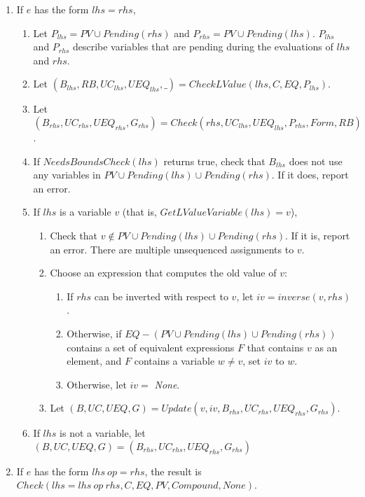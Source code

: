 \begin{enumerate}
\item If $e$ has the form $lhs = rhs$,
\label{list:check-assignment}
\begin{enumerate}
\item Let $P_{lhs} = PV \cup Pending(rhs)$ and $P_{rhs} = PV \cup Pending(lhs).$   $P_{lhs}$
        and $P_{rhs}$ describe variables that are pending during the evaluations of $lhs$ and $rhs$.
\item Let $(B_{lhs}, RB, \mathit{UC}_{lhs}, {UEQ}_{lhs}, \_) = CheckLValue(lhs, C, EQ, P_{lhs})$.  
\item Let $(B_{rhs},  \mathit{UC}_{rhs}, {UEQ}_{rhs}, G_{rhs}) = 
Check(rhs, \mathit{UC}_{lhs}, {UEQ}_{lhs},P_{rhs}, Form, RB)$.
\item If $NeedsBoundsCheck(lhs)$ returns true, check that $B_{lhs}$ does not use any variables in 
$PV \cup Pending(lhs) \cup Pending(rhs)$.  If it does, report an error.
\item  If $lhs$ is a variable $v$ (that is, $GetLValueVariable(lhs) = { v }$),
\begin{enumerate}
\item Check that $v \notin PV \cup Pending(lhs) \cup Pending(rhs)$.  If it is, report an error.  
There are multiple unsequenced assignments to $v$.
\item Choose an expression that computes the old value of $v$:
\begin{enumerate}
\item If $rhs$ can be inverted with respect to $v$, let $iv = inverse(v, rhs)$. 
\item Otherwise, if $EQ - (PV \cup Pending(lhs) \cup Pending(rhs))$ contains a set of equivalent expressions $F$ that contains $v$ as 
an element, and $F$ contains a variable $w \neq v$, set $iv$ to $w$.
\item Otherwise, let $iv = $ {\it None}.
\end{enumerate}
\item Let $(B, \mathit{UC}, UEQ, G) = Update(v, iv, B_{rhs}, \mathit{UC}_{rhs}, UEQ_{rhs}, G_{rhs})$.
\end{enumerate}
\item If $lhs$ is not a variable, let $(B, \mathit{UC}, UEQ, G) = (B_{rhs}, \mathit{UC}_{rhs}, UEQ_{rhs}, G_{rhs})$
\end{enumerate}


\item If $e$ has the form $lhs~op= rhs$, the result is 
$Check (lhs = lhs~op~rhs, C, EQ, PV, Compound, None)$.


\end{enumerate}

